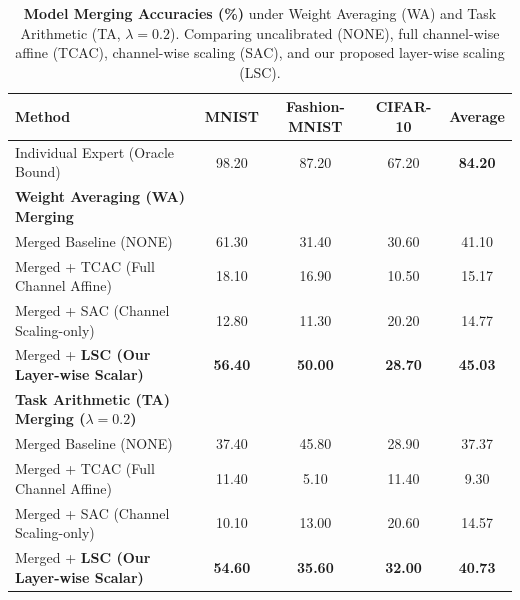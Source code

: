 \documentclass{article}
\theoremstyle{plain}
\theoremstyle{definition}
\theoremstyle{remark}
\begin{document}
\begin{table}[t]
\caption{\textbf{Model Merging Accuracies (\%)} under Weight Averaging (WA) and Task Arithmetic (TA, $\lambda=0.2$). Comparing uncalibrated (NONE), full channel-wise affine (TCAC), channel-wise scaling (SAC), and our proposed layer-wise scaling (LSC).}
\label{tab:main_results}
\vskip 0.05in
\begin{center}
\begin{small}
\begin{sc}
\begin{tabular}{lcccc}
\toprule
Method & MNIST & Fashion-MNIST & CIFAR-10 & \textbf{Average} \\
\midrule
Individual Expert (Oracle Bound) & 98.20 & 87.20 & 67.20 & \textbf{84.20} \\
\midrule
\textbf{Weight Averaging (WA) Merging} \\
Merged Baseline (NONE) & 61.30 & 31.40 & 30.60 & 41.10 \\
Merged + TCAC (Full Channel Affine) & 18.10 & 16.90 & 10.50 & 15.17 \\
Merged + SAC (Channel Scaling-only) & 12.80 & 11.30 & 20.20 & 14.77 \\
Merged + \textbf{LSC (Our Layer-wise Scalar)} & \textbf{56.40} & \textbf{50.00} & \textbf{28.70} & \textbf{45.03} \\
\midrule
\textbf{Task Arithmetic (TA) Merging ($\lambda = 0.2$)} \\
Merged Baseline (NONE) & 37.40 & 45.80 & 28.90 & 37.37 \\
Merged + TCAC (Full Channel Affine) & 11.40 & 5.10 & 11.40 & 9.30 \\
Merged + SAC (Channel Scaling-only) & 10.10 & 13.00 & 20.60 & 14.57 \\
Merged + \textbf{LSC (Our Layer-wise Scalar)} & \textbf{54.60} & \textbf{35.60} & \textbf{32.00} & \textbf{40.73} \\
\bottomrule
\end{tabular}
\end{sc}
\end{small}
\end{center}
\vspace{-10pt}
\vskip -0.15in
\end{table}
\end{document}
